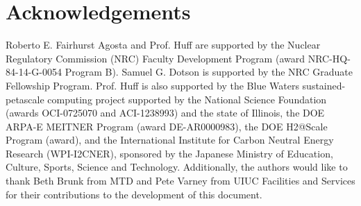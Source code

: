 \documentclass{anstrans}
\begin{document}
\section{Acknowledgements}

Roberto E. Fairhurst Agosta and Prof. Huff are supported by the Nuclear Regulatory Commission (NRC) Faculty Development Program (award NRC-HQ-84-14-G-0054 Program B). Samuel G. Dotson is supported by the NRC Graduate Fellowship Program. Prof. Huff is also supported by the Blue Waters sustained-petascale computing project supported by the National Science Foundation (awards OCI-0725070 and ACI-1238993) and the state of Illinois, the DOE ARPA-E MEITNER Program (award DE-AR0000983), the DOE H2@Scale Program (award), and the International Institute for Carbon Neutral Energy Research (WPI-I2CNER), sponsored by the Japanese Ministry of Education, Culture, Sports, Science and Technology.
Additionally, the authors would like to thank Beth Brunk from MTD and Pete Varney from UIUC Facilities and Services for their contributions to the development of this document.



\end{document}
